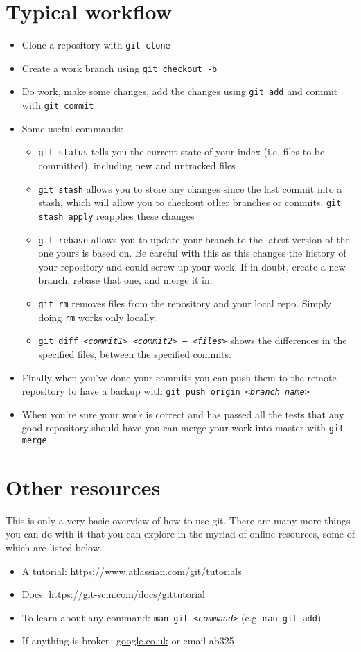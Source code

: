 \documentclass{article}
\newcommand{\code}[1]{\texttt{#1}}
\newcommand{\ital}[1]{\textit{#1}}
\begin{document}
\section{Typical workflow}
\begin{itemize}
  \item Clone a repository with \code{git clone}
  \item Create a work branch using \code{git checkout -b}
  \item Do work, make some changes, add the changes using \code{git add} and commit with \code{git commit}
  \item Some useful commands: 
  \begin{itemize}
   \item \code{git status} tells you the current state of your index (i.e. files to be committed), including new and untracked files
   \item \code{git stash} allows you to store any changes since the last commit into a stash, which will allow you to checkout other branches or commits. \code{git stash apply} reapplies these changes
   \item \code{git rebase} allows you to update your branch to the latest version of the one yours is based on. Be careful with this as this changes the history of your repository and could screw up your work. If in doubt, create a new branch, rebase that one, and merge it in. 
   \item \code{git rm} removes files from the repository and your local repo. Simply doing \code{rm} works only locally. 
   \item \code{git diff <\ital{commit1}> <\ital{commit2}> -- <\ital{files}>} shows the differences in the specified files, between the specified commits. 
  \end{itemize}
  \item Finally when you've done your commits you can push them to the remote repository to have a backup with \code{git push origin <\ital{branch name}>}
  \item When you're sure your work is correct and has passed all the tests that any good repository should have you can merge your work into master with \code{git merge}

\end{itemize}

\section{Other resources}
This is only a very basic overview of how to use git. There are many more things you can do with it that you can explore in the myriad of online resources, some of which are listed below.
\begin{itemize}
  \item A tutorial: \url{https://www.atlassian.com/git/tutorials}
  \item Docs: \url{https://git-scm.com/docs/gittutorial}
  \item To learn about any command: \code{man git-<\ital{command}>} (e.g. \code{man git-add})
  \item If anything is broken: \url{google.co.uk} or email ab325
\end{itemize}
\end{document}
